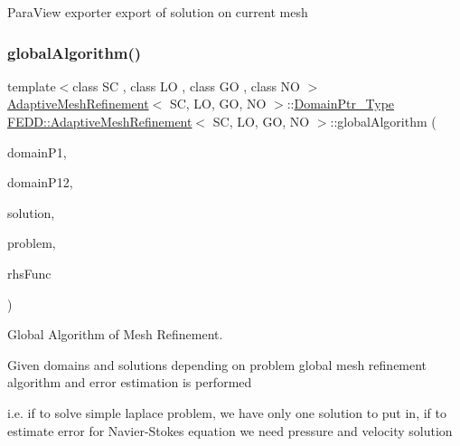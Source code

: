 Para\+View exporter export of solution on current mesh \mbox{\label{classFEDD_1_1AdaptiveMeshRefinement_a10f773edf498ea2bcc21c5b1dc36a32e}} 
\subsubsection{\texorpdfstring{global\+Algorithm()}{globalAlgorithm()}}
{\footnotesize\ttfamily template$<$class SC , class LO , class GO , class NO $>$ \\
\hyperlink{classFEDD_1_1AdaptiveMeshRefinement}{Adaptive\+Mesh\+Refinement}$<$ SC, LO, GO, NO $>$\+::\hyperlink{classFEDD_1_1AdaptiveMeshRefinement_a98b097661d0e4c38e4182582078e2cd6}{Domain\+Ptr\+\_\+\+Type} \hyperlink{classFEDD_1_1AdaptiveMeshRefinement}{F\+E\+D\+D\+::\+Adaptive\+Mesh\+Refinement}$<$ SC, LO, GO, NO $>$\+::global\+Algorithm (\begin{DoxyParamCaption}\item[{\hyperlink{classFEDD_1_1AdaptiveMeshRefinement_a98b097661d0e4c38e4182582078e2cd6}{Domain\+Ptr\+\_\+\+Type}}]{domain\+P1,  }\item[{\hyperlink{classFEDD_1_1AdaptiveMeshRefinement_a98b097661d0e4c38e4182582078e2cd6}{Domain\+Ptr\+\_\+\+Type}}]{domain\+P12,  }\item[{\hyperlink{classFEDD_1_1AdaptiveMeshRefinement_a62f59092ab4dee90885c4d38b123ca9c}{Block\+Multi\+Vector\+Const\+Ptr\+\_\+\+Type}}]{solution,  }\item[{\hyperlink{classFEDD_1_1AdaptiveMeshRefinement_a442c6ca5dc4d866e3b1c6cdb613e2281}{Problem\+Ptr\+\_\+\+Type}}]{problem,  }\item[{Rhs\+Func\+\_\+\+Type}]{rhs\+Func }\end{DoxyParamCaption})}



Global Algorithm of Mesh Refinement. 

Given domains and solutions depending on problem global mesh refinement algorithm and error estimation is performed

i.\+e. if to solve simple laplace problem, we have only one solution to put in, if to estimate error for Navier-\/\+Stokes equation we need pressure and velocity solution


